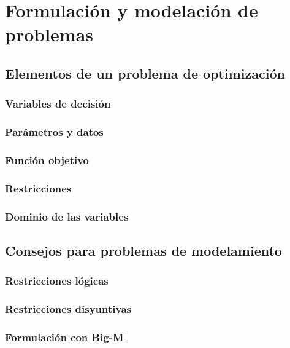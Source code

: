 \section{Formulación y modelación de problemas}

\subsection{Elementos de un problema de optimización}
\subsubsection{Variables de decisión}

\subsubsection{Parámetros y datos}

\subsubsection{Función objetivo}

\subsubsection{Restricciones}

\subsubsection{Dominio de las variables}

\subsection{Consejos para problemas de modelamiento}

\subsubsection{Restricciones lógicas}

\subsubsection{Restricciones disyuntivas}

\subsubsection{Formulación con Big-M}

